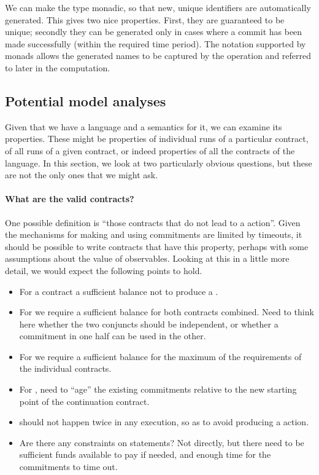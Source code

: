 \documentclass[
      acmsmall
    , screen
    , review=true
  ]{acmart}
\begin{document}
We can make the  type monadic, so that new, unique identifiers are automatically generated. This gives two nice properties. First, they are guaranteed to be unique; secondly they can be generated only in cases where a commit has been made successfully (within the required time period). The 
 notation supported by monads allows the generated names to be captured by the  operation and referred to later in the computation.


\subsection{Potential model analyses}
\label{section:analysis}

Given that we have a language and a semantics for it, we can examine its properties. These might be properties of 
individual runs of a particular contract, of all runs of a given contract, or indeed properties of all the contracts of 
the language. In this section, we look at two particularly obvious questions, but these are not the only ones that we 
might ask.



\paragraph{What are the valid contracts?}

One possible definition is ``those contracts that do not lead to a  action''.
Given the mechanisms for making and using commitments are limited by timeouts, it should be possible to write contracts that have this property, perhaps with some assumptions about the value of observables.
Looking at this in a little more detail, we would expect the following points to hold.
\begin{itemize}
\item For a  contract a sufficient balance not to produce a .
\item For  we require a sufficient balance for both contracts combined. Need to think here whether the two conjuncts should be independent, or whether a commitment in one half can be used in the other.
\item For  we require a sufficient balance for the maximum of the requirements of the individual contracts. 
\item For , need to ``age'' the existing commitments relative to the new starting point of the 
continuation contract.
\item {} should not happen twice in any execution, so as to avoid producing a
 action.
\item Are there any constraints on  statements? Not directly, but there need to be sufficient 
funds available to pay if needed, and enough time for the commitments to time out.
\end{itemize}
\end{document}
